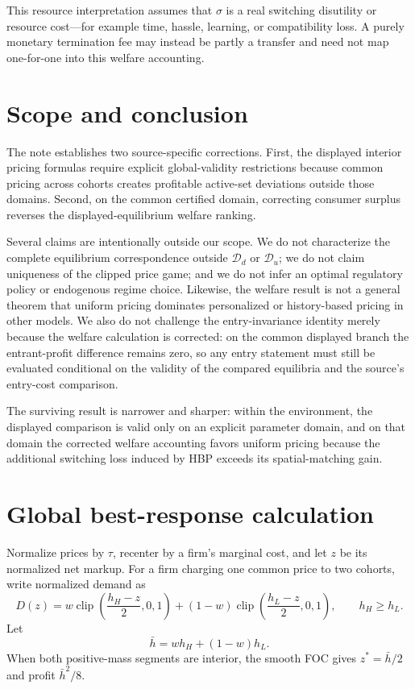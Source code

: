 \documentclass[11pt]{article}
\newcommand{\clip}{\operatorname{clip}}
\begin{document}
This resource interpretation assumes that $\sigma$ is a real switching
disutility or resource cost---for example time, hassle, learning, or
compatibility loss. A purely monetary termination fee may instead be partly a
transfer and need not map one-for-one into this welfare accounting.

\section{Scope and conclusion}

The note establishes two source-specific corrections. First, the displayed
interior pricing formulas require explicit global-validity restrictions because
common pricing across cohorts creates profitable active-set deviations outside
those domains. Second, on the common certified domain, correcting consumer
surplus reverses the displayed-equilibrium welfare ranking.

Several claims are intentionally outside our scope. We do not characterize the
complete equilibrium correspondence outside $\mathcal D_d$ or $\mathcal D_u$;
we do not claim uniqueness of the clipped price game; and we do not infer an
optimal regulatory policy or endogenous regime choice. Likewise, the welfare
result is not a general theorem that uniform pricing dominates personalized or
history-based pricing in other models. We also do not challenge the
entry-invariance identity merely because the welfare calculation is corrected:
on the common displayed branch the entrant-profit difference remains zero, so
any entry statement must still be evaluated conditional on the validity of the
compared equilibria and the source's entry-cost comparison.

The surviving result is narrower and sharper: within the
\citet{gehrig2011} environment, the displayed comparison is valid only on an
explicit parameter domain, and on that domain the corrected welfare accounting
favors uniform pricing because the additional switching loss induced by HBP
exceeds its spatial-matching gain.

\appendix

\section{Global best-response calculation}
\label{app:global}

Normalize prices by $\tau$, recenter by a firm's marginal cost, and let $z$ be
its normalized net markup. For a firm charging one common price to two cohorts,
write normalized demand as
\[
 D(z)
 =w\clip\!\left(\frac{h_H-z}{2},0,1\right)
 +(1-w)\clip\!\left(\frac{h_L-z}{2},0,1\right),
 \qquad h_H\geq h_L.
\]
Let
\[
 \bar h=wh_H+(1-w)h_L.
\]
When both positive-mass segments are interior, the smooth FOC gives
$z^*=\bar h/2$ and profit $\bar h^2/8$.
\end{document}
